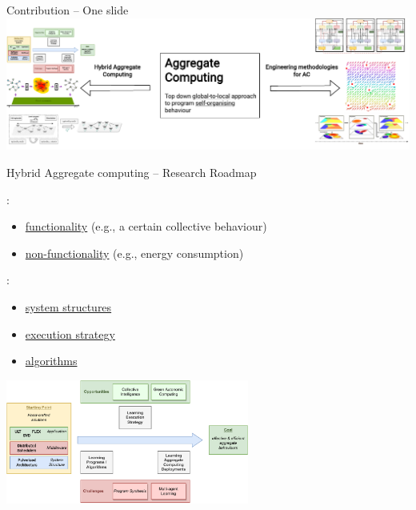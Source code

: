 \documentclass[presentation, 9pt,169]{beamer}\mode<presentation>{\usetheme{AMSBolognaFC}}
\begin{document}
\begin{frame}{Contribution -- One slide}
\\[0.5cm]
\includegraphics[width=\textwidth]{img/contribution.drawio.pdf}
\end{frame}

\begin{frame}{Hybrid Aggregate computing -- Research Roadmap}
  
  :
  \begin{itemize}
    \item \underline{functionality} (e.g., a certain collective behaviour)
    \item \underline{non-functionality} (e.g., energy consumption)
  \end{itemize}
  :
  \begin{itemize}
    \item \underline{system structures}
    \item \underline{execution strategy}
    \item \underline{algorithms}
  \end{itemize}
  \begin{center}
    \includegraphics[width=0.6\textwidth]{img/roadmap.pdf}
  \end{center}
\end{frame}
\end{document}

